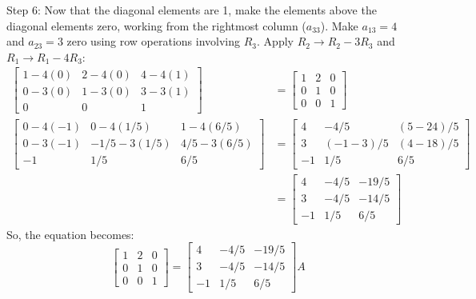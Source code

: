 \documentclass{article}
\begin{document}
Step 6: Now that the diagonal elements are 1, make the elements above the diagonal elements zero, working from the rightmost column ($a_{33}$). Make $a_{13}=4$ and $a_{23}=3$ zero using row operations involving $R_3$.
Apply $R_2 \to R_2 - 3R_3$ and $R_1 \to R_1 - 4R_3$:
\begin{align*} \begin{bmatrix} 1 - 4(0) & 2 - 4(0) & 4 - 4(1) \\ 0 - 3(0) & 1 - 3(0) & 3 - 3(1) \\ 0 & 0 & 1 \end{bmatrix} &= \begin{bmatrix} 1 & 2 & 0 \\ 0 & 1 & 0 \\ 0 & 0 & 1 \end{bmatrix} \\ \begin{bmatrix} 0 - 4(-1) & 0 - 4(1/5) & 1 - 4(6/5) \\ 0 - 3(-1) & -1/5 - 3(1/5) & 4/5 - 3(6/5) \\ -1 & 1/5 & 6/5 \end{bmatrix} &= \begin{bmatrix} 4 & -4/5 & (5 - 24)/5 \\ 3 & (-1 - 3)/5 & (4 - 18)/5 \\ -1 & 1/5 & 6/5 \end{bmatrix} \\ &= \begin{bmatrix} 4 & -4/5 & -19/5 \\ 3 & -4/5 & -14/5 \\ -1 & 1/5 & 6/5 \end{bmatrix}\end{align*}
So, the equation becomes:
\[ \begin{bmatrix} 1 & 2 & 0 \\ 0 & 1 & 0 \\ 0 & 0 & 1 \end{bmatrix} = \begin{bmatrix} 4 & -4/5 & -19/5 \\ 3 & -4/5 & -14/5 \\ -1 & 1/5 & 6/5 \end{bmatrix} A \]
\end{document}
